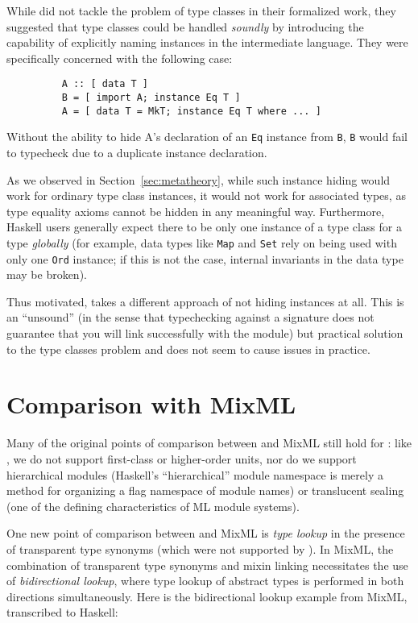While \OldBackpack{} did not tackle the problem of type classes in their
formalized work, they suggested that type classes could be handled
\emph{soundly} by introducing the capability of explicitly naming instances
in the intermediate language.  They were specifically concerned with the
following case:

\begin{figure}[H]
\begin{lstlisting}
    A :: [ data T ]
    B = [ import A; instance Eq T ]
    A = [ data T = MkT; instance Eq T where ... ]
\end{lstlisting}
\end{figure}

\noindent
Without the ability to hide A's declaration of an \verb|Eq| instance
from \verb|B|, \verb|B| would fail to typecheck due to a duplicate
instance declaration.

As we observed in Section~\ref{sec:metatheory}, while such instance
hiding would work for ordinary type class instances, it would not work
for associated types, as type equality axioms cannot be hidden in any
meaningful way.  Furthermore, Haskell users generally expect there
to be only one instance of a type class for a type \emph{globally} (for
example, data types like \verb|Map| and \verb|Set| rely on being used
with only one \verb|Ord| instance; if this is not the case, internal
invariants in the data type may be broken).

Thus motivated, \Backpack{} takes a different approach of not hiding
instances at all.  This is an ``unsound'' (in the sense that typechecking
against a signature does not guarantee that you will link successfully
with the module) but practical solution to the type classes problem
and does not seem to cause issues in practice.

\section{Comparison with MixML}

Many of the original points of comparison between \OldBackpack{} and
MixML still hold for \Backpack{}: like \OldBackpack{}, we do not support
first-class or higher-order units, nor do we support hierarchical
modules (Haskell's ``hierarchical'' module namespace is merely a method
for organizing a flag namespace of module names) or translucent sealing
(one of the defining characteristics of ML module systems).

One new point of comparison between \Backpack{} and MixML is \emph{type lookup}
in the presence of transparent type synonyms (which were not supported
by \OldBackpack{}).  In MixML, the combination of transparent type
synonyms and mixin linking necessitates the use of \emph{bidirectional lookup}, where
type lookup of abstract types is performed in both directions simultaneously.
Here is the bidirectional lookup example from MixML, transcribed to Haskell:

